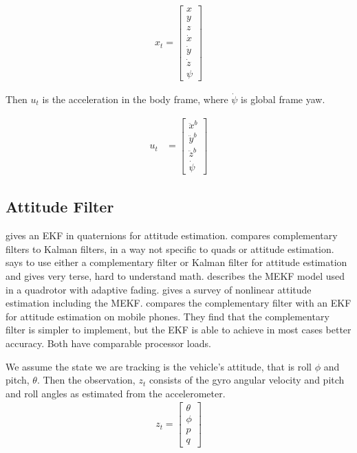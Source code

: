 \documentclass{article}
\begin{document}
\begin{align}
  x_t = \left[\begin{array}{c} 
      x\\
      y\\
      z\\
      \dot{x}\\
      \dot{y}\\
      \dot{z}\\
      \psi
      \end{array}\right]
\end{align}

Then $u_t$ is the acceleration in the body frame, where $\dot{\psi}$
is global frame yaw.

\begin{align}
  u_t &= \left[ \begin{array}{c}
      \ddot{x}^b \\
      \ddot{y}^b \\
      \ddot{z}^b \\
      \dot{\psi}
      \end{array} \right]
\end{align}



\subsection{Attitude Filter}
\label{sec:attitude}


\citet{markley2003attitude} gives an EKF in quaternions for attitude
estimation.  \citet{higgins1975comparison} compares complementary
filters to Kalman filters, in a way not specific to quads or attitude
estimation.  \citet{quan2017introduction} says to use either a
complementary filter or Kalman filter for attitude estimation and
gives very terse, hard to understand
math. \citet{johansen2017quadrotor} describes the MEKF model used in a
quadrotor with adaptive fading.  \citet{crassidis2007survey} gives a
survey of nonlinear attitude estimation including the MEKF.
\citet{nowicki2015simplicity} compares the complementary filter with
an EKF for attitude estimation on mobile phones.  They find that the
complementary filter is simpler to implement, but the EKF is able to
achieve in most cases better accuracy.  Both have comparable processor
loads.


We assume the state we are tracking is the vehicle's attitude, that is
roll $\phi$ and pitch, $\theta$.  Then the observation, $z_t$ consists
of the gyro angular velocity and pitch and roll angles as estimated
from the accelerometer.
\begin{align}
  z_t = \left[ \begin{array}{c}\theta\\\phi\\p\\q \end{array}\right]
\end{align}
\end{document}
